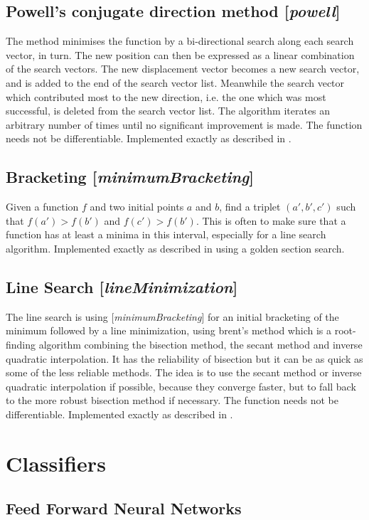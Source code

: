 \documentclass[11pt]{article}
\newcommand{\nllref}[1]{[\small{\textit{#1}}]}
\begin{document}
\subsection{Powell's conjugate direction method \nllref{powell}}
The method minimises the function by a bi-directional search along each search vector, in turn. The new position can then be expressed as a linear combination of the search vectors. The new displacement vector becomes a new search vector, and is added to the end of the search vector list. Meanwhile the search vector which contributed most to the new direction, i.e. the one which was most successful, is deleted from the search vector list. The algorithm iterates an arbitrary number of times until no significant improvement is made. The function needs not be differentiable. Implemented exactly as described in \cite{NumericalRecipes}.


\subsection{Bracketing \nllref{minimumBracketing}}
Given a function $f$ and two initial points $a$ and $b$, find a triplet $(a', b', c')$ such that $f(a')>f(b')$ and  $f(c')>f(b')$. This is often to make sure that a function has at least a minima in this interval, especially for a line search algorithm. Implemented exactly as described in \cite{NumericalRecipes} using a golden section search.

\subsection{Line Search \nllref{lineMinimization}}
The line search is using \nllref{minimumBracketing} for an initial bracketing of the minimum followed by a line minimization, using brent's method which is a root-finding algorithm combining the bisection method, the secant method and inverse quadratic interpolation. It has the reliability of bisection but it can be as quick as some of the less reliable methods. The idea is to use the secant method or inverse quadratic interpolation if possible, because they converge faster, but to fall back to the more robust bisection method if necessary. The function needs not be differentiable. Implemented exactly as described in \cite{NumericalRecipes}.

\section{Classifiers}
\subsection{Feed Forward Neural Networks}
\end{document}
